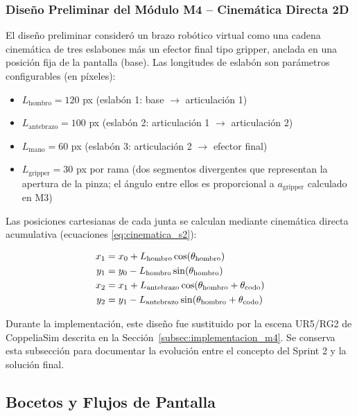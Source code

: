\subsubsection*{Diseño Preliminar del Módulo M4 -- Cinemática Directa 2D}

El diseño preliminar consideró un brazo robótico virtual como una cadena cinemática de tres
eslabones más un efector final tipo gripper, anclada en una posición
fija de la pantalla (base). Las longitudes de eslabón son parámetros
configurables (en píxeles):

\begin{itemize}[leftmargin=1.5em]
    \item $L_{\text{hombro}} = 120$ px (eslabón 1: base $\to$
          articulación 1)
    \item $L_{\text{antebrazo}} = 100$ px (eslabón 2: articulación 1
          $\to$ articulación 2)
    \item $L_{\text{mano}} = 60$ px (eslabón 3: articulación 2
          $\to$ efector final)
    \item $L_{\text{gripper}} = 30$ px por rama (dos segmentos
          divergentes que representan la apertura de la pinza;
          el ángulo entre ellos es proporcional a
          $a_{\text{gripper}}$ calculado en M3)
\end{itemize}

Las posiciones cartesianas de cada junta se calculan mediante cinemática
directa acumulativa (ecuaciones \ref{eq:cinematica_s2}):

\begin{align}
  x_1 &= x_0 + L_{\text{hombro}}\cos(\theta_{\text{hombro}})
  \notag \\
  y_1 &= y_0 - L_{\text{hombro}}\sin(\theta_{\text{hombro}})
  \notag \\
  x_2 &= x_1 + L_{\text{antebrazo}}
               \cos(\theta_{\text{hombro}} + \theta_{\text{codo}})
  \notag \\
  y_2 &= y_1 - L_{\text{antebrazo}}
               \sin(\theta_{\text{hombro}} + \theta_{\text{codo}})
  \label{eq:cinematica_s2}
\end{align}

Durante la implementación, este diseño fue sustituido por la escena UR5/RG2 de
CoppeliaSim descrita en la Sección~\ref{subsec:implementacion_m4}. Se conserva
esta subsección para documentar la evolución entre el concepto del Sprint 2 y
la solución final.

\subsection{Bocetos y Flujos de Pantalla}

